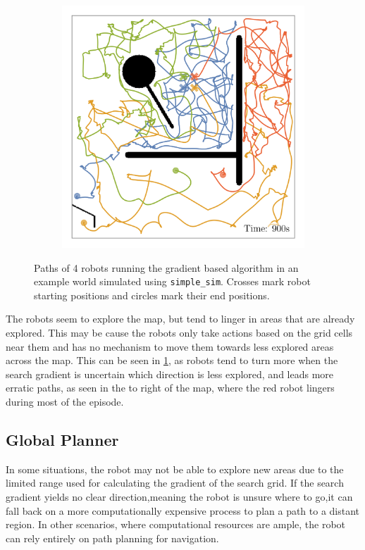 \begin{figure}[H]
\begin{subfigure}[b]{\w}
    \end{subfigure}
    \begin{subfigure}[b]{\w}
        \centering
        \includegraphics[width=\textwidth]{./figures/plots/gradient-paths/search:gradient-paths-(after-900s).png}
    \end{subfigure}
    \caption{Paths of 4 robots running the gradient based algorithm in an example world simulated using \texttt{simple\_sim}. Crosses mark robot starting positions and circles mark their end positions.}
    \label{fig:gradient-paths}
\end{figure}

The robots seem to explore the map, but tend to linger in areas that are already explored. This may be cause the robots only take actions based on the grid cells near them and has no mechanism to move them towards less explored areas across the map. This can be seen in \cref{fig:gradient-paths}, as robots tend to turn more when the search gradient is {\color{red} uncertain} which direction is less explored, and leads more erratic paths, as seen in the to right of the map, where the red robot lingers during most of the episode.


\subsection{Global Planner}
In some situations, the robot may not be able to explore new areas due to the limited range used for calculating the gradient of the search grid.
If the search gradient yields no clear direction,meaning the robot is unsure where to go,it can fall back on a more computationally expensive process to plan a path to a distant region.
In other scenarios, where computational resources are ample, the robot can rely entirely on path planning for navigation.

